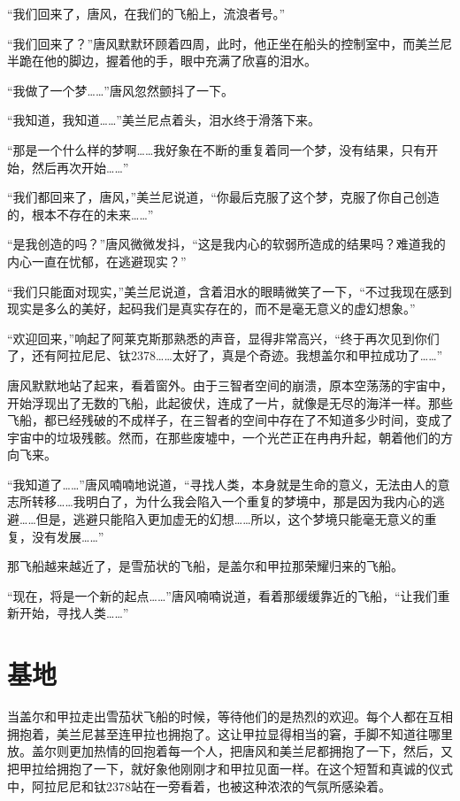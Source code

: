 “我们回来了，唐风，在我们的飞船上，流浪者号。” 

“我们回来了？”唐风默默环顾着四周，此时，他正坐在船头的控制室中，而美兰尼半跪在他的脚边，握着他的手，眼中充满了欣喜的泪水。 

“我做了一个梦……”唐风忽然颤抖了一下。 

“我知道，我知道……”美兰尼点着头，泪水终于滑落下来。 

“那是一个什么样的梦啊……我好象在不断的重复着同一个梦，没有结果，只有开始，然后再次开始……” 

“我们都回来了，唐风，”美兰尼说道，“你最后克服了这个梦，克服了你自己创造的，根本不存在的未来……” 

“是我创造的吗？”唐风微微发抖，“这是我内心的软弱所造成的结果吗？难道我的内心一直在忧郁，在逃避现实？” 

“我们只能面对现实，”美兰尼说道，含着泪水的眼睛微笑了一下，“不过我现在感到现实是多么的美好，起码我们是真实存在的，而不是毫无意义的虚幻想象。” 

“欢迎回来，”响起了阿莱克斯那熟悉的声音，显得非常高兴，“终于再次见到你们了，还有阿拉尼尼、钛2378……太好了，真是个奇迹。我想盖尔和甲拉成功了……” 

唐风默默地站了起来，看着窗外。由于三智者空间的崩溃，原本空荡荡的宇宙中，开始浮现出了无数的飞船，此起彼伏，连成了一片，就像是无尽的海洋一样。那些飞船，都已经残破的不成样子，在三智者的空间中存在了不知道多少时间，变成了宇宙中的垃圾残骸。然而，在那些废墟中，一个光芒正在冉冉升起，朝着他们的方向飞来。 

“我知道了……”唐风喃喃地说道，“寻找人类，本身就是生命的意义，无法由人的意志所转移……我明白了，为什么我会陷入一个重复的梦境中，那是因为我内心的逃避……但是，逃避只能陷入更加虚无的幻想……所以，这个梦境只能毫无意义的重复，没有发展……” 

那飞船越来越近了，是雪茄状的飞船，是盖尔和甲拉那荣耀归来的飞船。 

“现在，将是一个新的起点……”唐风喃喃说道，看着那缓缓靠近的飞船，“让我们重新开始，寻找人类……” 

\chapter{基地}

当盖尔和甲拉走出雪茄状飞船的时候，等待他们的是热烈的欢迎。每个人都在互相拥抱着，美兰尼甚至连甲拉也拥抱了。这让甲拉显得相当的窘，手脚不知道往哪里放。盖尔则更加热情的回抱着每一个人，把唐风和美兰尼都拥抱了一下，然后，又把甲拉给拥抱了一下，就好象他刚刚才和甲拉见面一样。在这个短暂和真诚的仪式中，阿拉尼尼和钛2378站在一旁看着，也被这种浓浓的气氛所感染着。 

